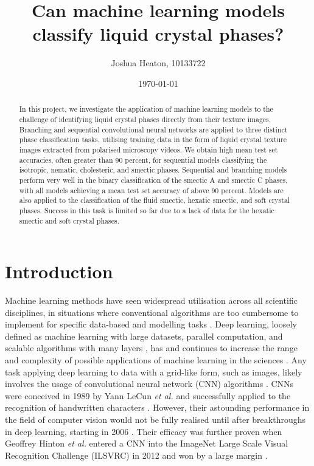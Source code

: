 \documentclass[12pt]{article}
\begin{document}
\title{Can machine learning models classify liquid crystal phases?}
\author{Joshua Heaton, 10133722}
\date{\today}

\maketitle

\begin{abstract}
In this project, we investigate the application of machine learning models to the challenge of identifying liquid crystal phases directly from their texture images. Branching and sequential convolutional neural networks are applied to three distinct phase classification tasks, utilising training data in the form of liquid crystal texture images extracted from polarised microscopy videos. We obtain high mean test set accuracies, often greater than 90 percent, for sequential models classifying the isotropic, nematic, cholesteric, and smectic phases. Sequential and branching models perform very well in the binary classification of the smectic A and smectic C phases, with all models achieving a mean test set accuracy of above 90 percent. Models are also applied to the classification of the fluid smectic, hexatic smectic, and soft crystal phases. Success in this task is limited so far due to a lack of data for the hexatic smectic and soft crystal phases.
\end{abstract}

\newpage
\tableofcontents

\newpage
{}

\section{Introduction}
Machine learning methods have seen widespread utilisation across all scientific disciplines, in situations where conventional algorithms are too cumbersome to implement for specific data-based and modelling tasks \cite{Carleo19}. Deep learning, loosely defined as machine learning with large datasets, parallel computation, and scalable algorithms with many layers \cite{Goodfellow16}, has and continues to increase the range and complexity of possible applications of machine learning in the sciences \cite{Carleo19}. Any task applying deep learning to data with a grid-like form, such as images, likely involves the usage of convolutional neural network (CNN) algorithms \cite{Goodfellow16}. CNNs were conceived in 1989 by Yann LeCun \textit{et al.} and successfully applied to the recognition of handwritten characters \cite{LeCun89}. However, their astounding performance in the field of computer vision would not be fully realised until after breakthroughs in deep learning, starting in 2006 \cite{Goodfellow16}. Their efficacy was further proven when Geoffrey Hinton \textit{et al.} entered a CNN into the ImageNet Large Scale Visual Recognition Challenge (ILSVRC) in 2012 and won by a large margin \cite{ILSVRC15}.
\end{document}
